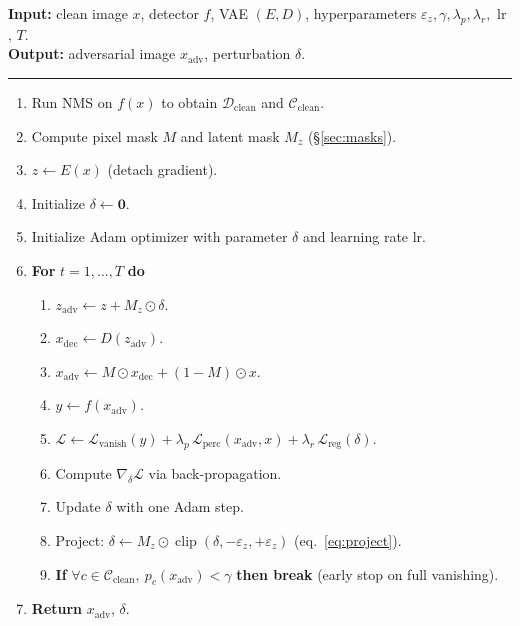 \documentclass[11pt,a4paper]{article}
\DeclareMathOperator{\clip}{clip}
\begin{document}
\begin{tcolorbox}[
    colback=gray!3, colframe=gray!50, boxrule=0.4pt,
    title={\small\textbf{Algorithm 1 -- Object-aware latent adversarial attack}},
    fonttitle=\sffamily, coltitle=black, colbacktitle=gray!15,
    arc=2pt, breakable
]
\small
\begin{flushleft}
\textbf{Input:} clean image $x$, detector $f$, VAE $(E, D)$,
hyperparameters $\varepsilon_z, \gamma, \lambda_p, \lambda_r,$ lr$,\, T$. \\[2pt]
\textbf{Output:} adversarial image $x_{\text{adv}}$, perturbation $\delta$.
\end{flushleft}

\vspace{-4pt}
\hrule
\vspace{4pt}

\begin{enumerate}[leftmargin=*, itemsep=1pt, label=\arabic*.]
\item Run NMS on $f(x)$ to obtain $\mathcal{D}_{\text{clean}}$ and $\mathcal{C}_{\text{clean}}$.
\item Compute pixel mask $M$ and latent mask $M_z$ \quad (\S\ref{sec:masks}).
\item $z \leftarrow E(x)$ \quad (detach gradient).
\item Initialize $\delta \leftarrow \mathbf{0}$.
\item Initialize Adam optimizer with parameter $\delta$ and learning rate lr.
\item \textbf{For} $t = 1, \ldots, T$ \textbf{do}
\begin{enumerate}[leftmargin=2em, itemsep=0pt, label=(\alph*)]
    \item $z_{\text{adv}} \leftarrow z + M_z \odot \delta$.
    \item $x_{\text{dec}} \leftarrow D(z_{\text{adv}})$.
    \item $x_{\text{adv}} \leftarrow M \odot x_{\text{dec}} + (1-M) \odot x$.
    \item $y \leftarrow f(x_{\text{adv}})$.
    \item $\mathcal{L} \leftarrow \mathcal{L}_{\text{vanish}}(y)
           + \lambda_p\, \mathcal{L}_{\text{perc}}(x_{\text{adv}}, x)
           + \lambda_r\, \mathcal{L}_{\text{reg}}(\delta)$.
    \item Compute $\nabla_\delta \mathcal{L}$ via back-propagation.
    \item Update $\delta$ with one Adam step.
    \item Project: $\delta \leftarrow M_z \odot \clip(\delta, -\varepsilon_z, +\varepsilon_z)$
          \quad (eq.~\eqref{eq:project}).
    \item \textbf{If} $\forall c \in \mathcal{C}_{\text{clean}},\ p_c(x_{\text{adv}}) < \gamma$ \textbf{then break}
          \quad (early stop on full vanishing).
\end{enumerate}
\item \textbf{Return} $x_{\text{adv}}$, $\delta$.
\end{enumerate}
\end{tcolorbox}\label{alg:attack}
\end{document}

